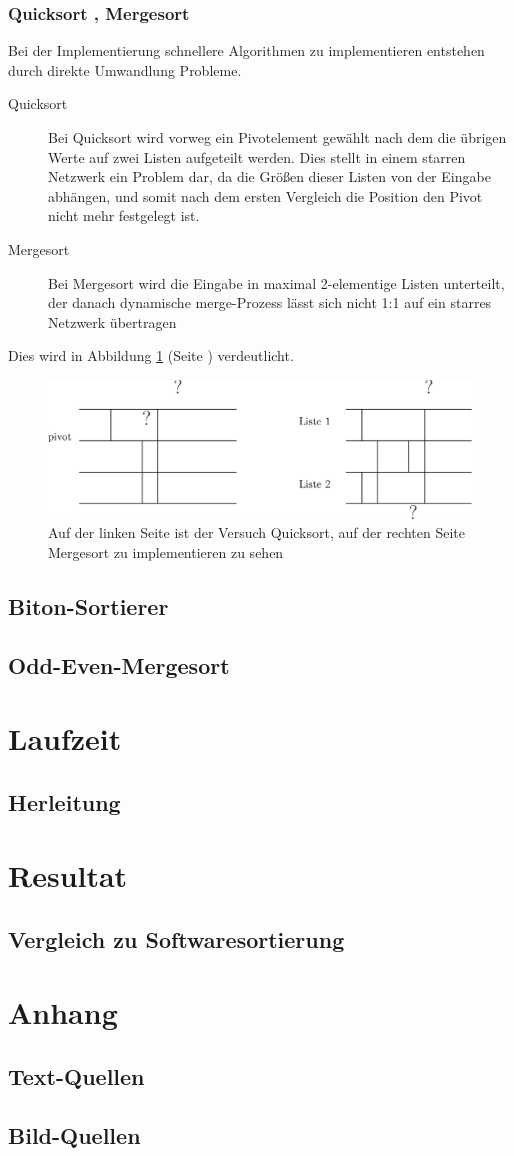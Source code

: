 \documentclass[11pt]{article}
\begin{document}
\subsubsection{Quicksort , Mergesort}
Bei der Implementierung schnellere Algorithmen zu implementieren entstehen durch direkte Umwandlung Probleme. 
\begin{description}
\item[Quicksort] Bei Quicksort wird vorweg ein Pivotelement gewählt nach dem die übrigen Werte auf zwei Listen aufgeteilt werden. Dies stellt in einem starren Netzwerk ein Problem dar, da die Größen dieser Listen von der Eingabe abhängen, und somit nach dem ersten Vergleich die Position den Pivot nicht mehr festgelegt ist. 
\item[Mergesort] Bei Mergesort wird die Eingabe in maximal 2-elementige Listen unterteilt, der danach dynamische merge-Prozess lässt sich nicht 1:1 auf ein starres Netzwerk übertragen
\end{description}
Dies wird in Abbildung \ref{fig:mergesort} (Seite \pageref{fig:mergesort}) verdeutlicht.
\begin{figure}
\begin{center}
\includegraphics[scale=0.8]{mergesort.eps}
\end{center}
\caption{Auf der linken Seite ist der Versuch Quicksort, auf der rechten Seite Mergesort zu implementieren zu sehen}
\label{fig:mergesort}
\end{figure}
\subsection{Biton-Sortierer}
\subsection{Odd-Even-Mergesort}
\section{Laufzeit}
\subsection{Herleitung}
\section{Resultat}
\subsection{Vergleich zu Softwaresortierung}
\section{Anhang}
\subsection{Text-Quellen}
\subsection{Bild-Quellen}
\end{document}
